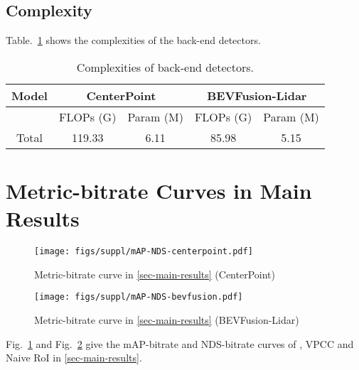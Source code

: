 \subsection{Complexity}

Table.~\ref{tab-backend-detector-complexity} shows the complexities of the back-end detectors.

\begin{table}[ht]
    \centering
    \renewcommand{\arraystretch}{\TABVSPACE} %
    \setlength{\tabcolsep}{2pt} %
    \caption{Complexities of back-end detectors.}
    \begin{tabular}{c|c|c|c|c}
    \hline
     Model      & \multicolumn{2}{c|}{CenterPoint} & \multicolumn{2}{c}{BEVFusion-Lidar} \\
     
    \hline
      & FLOPs (G) & Param (M) &  FLOPs (G) & Param (M)  \\ 
\cline{2-3}         \cline{4-5}
    \hline
        Total & 119.33 & 6.11 & 85.98 & 5.15 \\ 
    \hline
    \end{tabular}
    \label{tab-backend-detector-complexity}
\end{table}



\section{Metric-bitrate Curves in Main Results}

\begin{figure}[t]
  \centering
    \texttt{[image: figs/suppl/mAP-NDS-centerpoint.pdf]}
  \caption[]{Metric-bitrate curve in \cref{sec-main-results} (CenterPoint)}
\label{fig-suppl-curve-centerpoint}
\end{figure}

\begin{figure}[t]
  \centering
    \texttt{[image: figs/suppl/mAP-NDS-bevfusion.pdf]}
  \caption[]{Metric-bitrate curve in \cref{sec-main-results} (BEVFusion-Lidar)}
\label{fig-suppl-curve-bevfusion}
\end{figure}

Fig.~\ref{fig-suppl-curve-centerpoint} and Fig.~\ref{fig-suppl-curve-bevfusion} give the mAP-bitrate and NDS-bitrate curves of \methodname{}, VPCC and Naive RoI in \cref{sec-main-results}.

